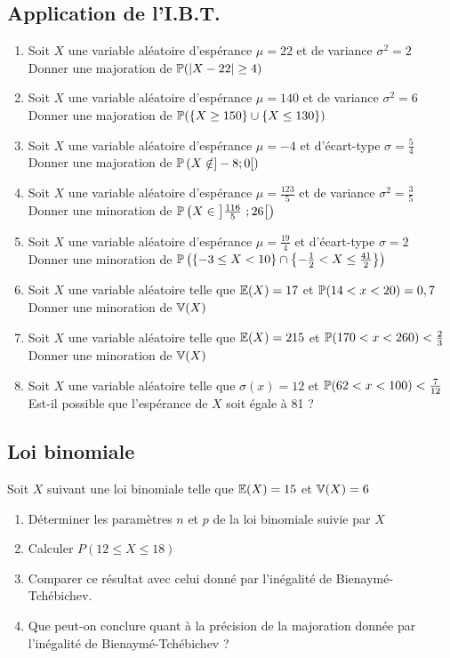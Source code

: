 \documentclass[oneside,12pt]{book}          %
\begin{document}
\subsection{Application de l'I.B.T.}
\begin{enumerate}\setlength{\itemsep}{0pt}
    \item Soit $X$ une variable aléatoire d'espérance $\mu=22$ et de variance $\sigma^2=2$\\
    Donner une majoration de ${\mathbb P}({\left\lvert X-22 \right\rvert}\geq4)$
    \item Soit $X$ une variable aléatoire d'espérance $\mu=140$ et de variance $\sigma^2=6$\\
    Donner une majoration de ${\mathbb P}(\{X\geq150\}\cup\{X\leq130\})$
    \item Soit $X$ une variable aléatoire d'espérance $\mu=-4$ et d'écart-type $\sigma=\frac{5}{4}$\\
    Donner une majoration de ${\mathbb P}\left(X\notin]-8;0[\right)$
    \item Soit $X$ une variable aléatoire d'espérance $\mu=\frac{123}{5}$ et de variance $\sigma^2=\frac{3}{5}$\\
    Donner une minoration de ${\mathbb P}\left(X\in\left]\frac{116}{5}~;26\right[\right)$
    \item Soit $X$ une variable aléatoire d'espérance $\mu=\frac{19}{4}$ et d'écart-type $\sigma=2$\\
    Donner une minoration de ${\mathbb P}\left(\{-3\leq X<10\}\cap\left\{-\frac{1}{2}<X\leq\frac{41}{2}\right\}\right)$
    \item Soit $X$ une variable aléatoire telle que ${\mathbb E}(X)=17$ et ${\mathbb P}(14<x<20)=0,7$\\
    Donner une minoration de ${\mathbb V}(X)$
    \item Soit $X$ une variable aléatoire telle que ${\mathbb E}(X)=215$ et ${\mathbb P}(170<x<260)<\frac{2}{3}$\\
    Donner une minoration de ${\mathbb V}(X)$
    \item Soit $X$ une variable aléatoire telle que $\sigma(x)=12$ et ${\mathbb P}(62<x<100)<\frac{7}{12}$\\
    Est-il possible que l'espérance de $X$ soit égale à 81 ?
\end{enumerate}



\subsection{Loi binomiale}
Soit $X$ suivant une loi binomiale telle que ${\mathbb E}(X)=15$ et ${\mathbb V}(X)=6$
\begin{enumerate}
    \item Déterminer les paramètres $n$ et $p$ de la loi binomiale suivie par $X$
    \item Calculer $P(12\leq X\leq18)$
    \item Comparer ce résultat avec celui donné par l'inégalité de Bienaymé-Tchébichev.
    \item Que peut-on conclure quant à la précision de la majoration donnée par l'inégalité de Bienaymé-Tchébichev ?
\end{enumerate}
\end{document}
